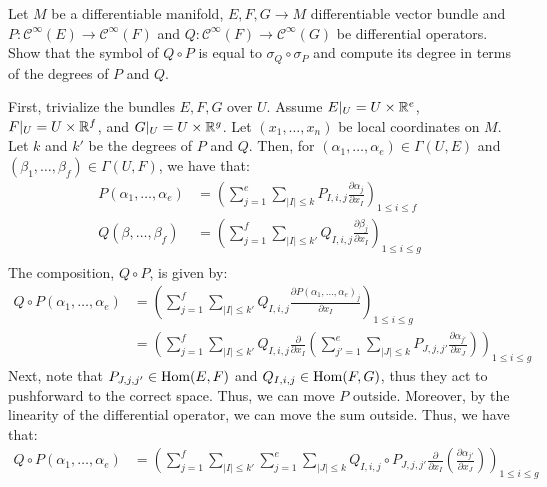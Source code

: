 \documentclass[12pt]{article}
\begin{document}
\begin{problem}{1.2}
    Let $M$ be a differentiable manifold, $E, F, G \to M$ differentiable vector bundle and $P: \mathcal{C}^\infty(E) \to \mathcal{C}^\infty(F)$ and $Q: \mathcal{C}^\infty(F) \to \mathcal{C}^\infty(G)$ be differential operators. Show that the symbol of $Q \circ P$ is equal to $\sigma_Q \circ \sigma_P$ and compute its degree in terms of the degrees of $P$ and $Q$.
\end{problem}
\begin{solution}
    First, trivialize the bundles $E, F, G$ over $U$. Assume $E|_U = U \times \mathbb R^e$, $F|_U = U \times \mathbb R^f$, and $G|_U = U \times \mathbb R^g$. Let $(x_1, \ldots, x_n)$ be local coordinates on $M$. Let $k$ and $k'$ be the degrees of $P$ and $Q$. Then, for $(\alpha_1, \ldots, \alpha_e) \in \Gamma(U, E)$ and $(\beta_1, \ldots, \beta_f) \in \Gamma(U, F)$, we have that:
    \begin{align*}
        P(\alpha_1, \ldots, \alpha_e) &= \left(\sum_{j=1}^e \sum_{|I|\leq k} P_{I, i, j} \frac{\partial \alpha_j}{\partial x_I} \right)_{1 \leq i \leq f } \\
        Q(\beta, \ldots, \beta_f) &= \left(\sum_{j=1}^f \sum_{|I|\leq k'} Q_{I, i, j} \frac{\partial \beta_j}{\partial x_I} \right)_{1 \leq i \leq g } \\
    \end{align*}
    The composition, $Q \circ P$, is given by:
    \begin{align*}
        Q \circ P(\alpha_1, \ldots, \alpha_e) &=  \left(\sum_{j=1}^f \sum_{|I|\leq k'} Q_{I, i, j} \frac{\partial P(\alpha_1, \ldots, \alpha_e)_j}{\partial x_I} \right)_{1 \leq i \leq g } \\ 
        &=  \left(\sum_{j=1}^f \sum_{|I|\leq k'} Q_{I, i, j} \frac{\partial }{\partial x_I}\left(\sum_{j'=1}^e \sum_{|J|\leq k} P_{J, j, j'} \frac{\partial \alpha_{j'}}{\partial x_J} \right) \right)_{1 \leq i \leq g }
    \end{align*}
    Next, note that $P_{J, j, j'} \in \operatorname{Hom}(E, F)$ and $Q_{I, i, j} \in \operatorname{Hom}(F, G)$, thus they act to pushforward to the correct space. Thus, we can move $P$ outside. Moreover, by the linearity of the differential operator, we can move the sum outside. Thus, we have that:
    \begin{align*}
        Q \circ P(\alpha_1, \ldots, \alpha_e) &= \left(\sum_{j=1}^f \sum_{|I|\leq k'} \sum_{j=1}^e \sum_{|J|\leq k} Q_{I, i, j} \circ P_{J, j, j'}  \frac{\partial }{\partial x_I}\left( \frac{\partial \alpha_{j'}}{\partial x_J} \right) \right)_{1 \leq i \leq g }

\end{align*}
\end{solution}
\end{document}
